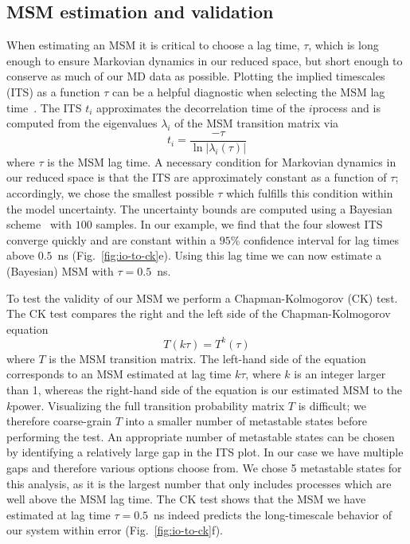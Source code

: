 \documentclass[9pt,tutorial]{livecoms}
\begin{document}
\subsection{MSM estimation and validation}
When estimating an MSM it is critical to choose a lag time, $\tau$, which is long enough to ensure Markovian dynamics in our reduced space, but short enough to conserve as much of our MD data as possible.
Plotting the implied timescales (ITS) as a function $\tau$ can be a helpful diagnostic when selecting the MSM lag time~\cite{swope-its}. The ITS $t_i$ approximates the decorrelation time of the $i$\th process and is computed from the eigenvalues $\lambda_i$ of the MSM transition matrix via
\begin{equation}
\label{eq:its}
t_i = \frac{-\tau}{\ln\left|\lambda_i(\tau)\right|}
\end{equation}
where $\tau$ is the MSM lag time.
A necessary condition for Markovian dynamics in our reduced space is that the ITS are approximately constant as a function of $\tau$; accordingly, we chose the smallest possible $\tau$ which fulfills this condition within the model uncertainty. The uncertainty bounds are computed using a Bayesian scheme~\cite{ben-rev-msm,noe-tmat-sampling} with $100$ samples.
In our example, we find that the four slowest ITS converge quickly and are constant within a $95\%$ confidence interval for lag times above $0.5$~ns (Fig.~\ref{fig:io-to-ck}e). Using this lag time we can now estimate a (Bayesian) MSM with $\tau=0.5$~ns. 

To test the validity of our MSM we perform a Chapman-Kolmogorov (CK) test. The CK test compares the right and the left side of the Chapman-Kolmogorov equation
\begin{equation}
\label{eq:ck}
T(k \tau) = T^k(\tau)
\end{equation}
where $T$ is the MSM transition matrix. The left-hand side of the equation corresponds to an MSM estimated at lag time $k\tau$, where $k$ is an integer larger than 1, whereas the right-hand side of the equation is our estimated MSM to the $k$\th power.
Visualizing the full transition probability matrix $T$ is difficult; we therefore coarse-grain $T$ into a smaller number of metastable states before performing the test.
An appropriate number of metastable states can be chosen by identifying a relatively large gap in the ITS plot.
In our case we have multiple gaps and therefore various options choose from.
We chose 5 metastable states for this analysis, as it is the largest number that only includes processes which are well above the MSM lag time.
The CK test shows that the MSM we have estimated at lag time $\tau=0.5$~ns indeed predicts the long-timescale behavior of our system within error (Fig.~\ref{fig:io-to-ck}f).
\end{document}
